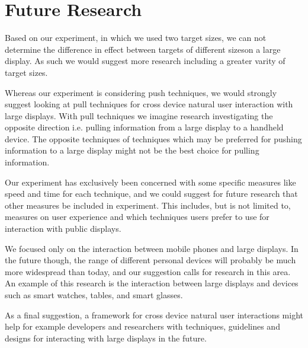 \section{Future Research} \label{sec:futureresearch}
Based on our experiment, in which we used two target sizes, we can not determine the difference in effect between targets of different sizeson a large display. As such we would suggest more research including a greater varity of target sizes.

Whereas our experiment is considering push techniques, we would strongly suggest looking at pull techniques for cross device natural user interaction with large displays.
With pull techniques we imagine research investigating the opposite direction i.e. pulling information from a large display to a handheld device.
The opposite techniques of techniques which may be preferred for pushing information to a large display might not be the best choice for pulling information.

Our experiment has exclusively been concerned with some specific measures like speed and time for each technique, and we could suggest for future research that other measures be included in experiment.
This includes, but is not limited to, measures on user experience and which techniques users prefer to use for interaction with public displays.

We focused only on the interaction between mobile phones and large displays. In the future though, the range of different personal devices will probably be much more widespread than today, and our suggestion calls for research in this area. An example of this research is the interaction between large displays and devices such as smart watches, tables, and smart glasses.

As a final suggestion, a framework for cross device natural user interactions might help for example developers and researchers with techniques, guidelines and designs for interacting with large displays in the future.